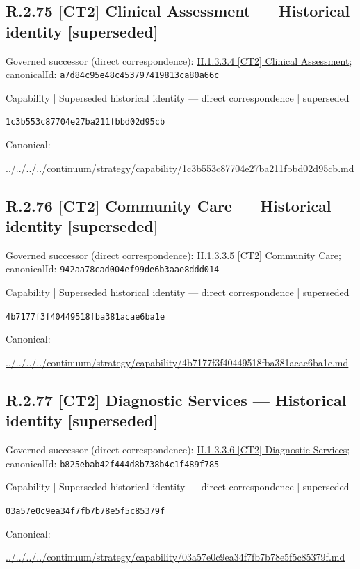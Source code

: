 \documentclass[10pt,a4paper]{article}
\begin{document}
\subsection*{R.2.75 [CT2] Clinical Assessment — Historical identity [superseded]}
Governed successor (direct correspondence): \hyperref[element-a7d84c95e48c453797419813ca80a66c]{II.1.3.3.4 [CT2] Clinical Assessment}; canonicalId: \texttt{a7d84c95e48c453797419813ca80a66c}\par
\label{element-1c3b553c87704e27ba211fbbd02d95cb}
{\small Capability | Superseded historical identity — direct correspondence | superseded}\par
\texttt{1c3b553c87704e27ba211fbbd02d95cb}\par
Canonical: \par
{\footnotesize\url{../../../../continuum/strategy/capability/1c3b553c87704e27ba211fbbd02d95cb.md}}\par
\subsection*{R.2.76 [CT2] Community Care — Historical identity [superseded]}
Governed successor (direct correspondence): \hyperref[element-942aa78cad004ef99de6b3aae8ddd014]{II.1.3.3.5 [CT2] Community Care}; canonicalId: \texttt{942aa78cad004ef99de6b3aae8ddd014}\par
\label{element-4b7177f3f40449518fba381acae6ba1e}
{\small Capability | Superseded historical identity — direct correspondence | superseded}\par
\texttt{4b7177f3f40449518fba381acae6ba1e}\par
Canonical: \par
{\footnotesize\url{../../../../continuum/strategy/capability/4b7177f3f40449518fba381acae6ba1e.md}}\par
\subsection*{R.2.77 [CT2] Diagnostic Services — Historical identity [superseded]}
Governed successor (direct correspondence): \hyperref[element-b825ebab42f444d8b738b4c1f489f785]{II.1.3.3.6 [CT2] Diagnostic Services}; canonicalId: \texttt{b825ebab42f444d8b738b4c1f489f785}\par
\label{element-03a57e0c9ea34f7fb7b78e5f5c85379f}
{\small Capability | Superseded historical identity — direct correspondence | superseded}\par
\texttt{03a57e0c9ea34f7fb7b78e5f5c85379f}\par
Canonical: \par
{\footnotesize\url{../../../../continuum/strategy/capability/03a57e0c9ea34f7fb7b78e5f5c85379f.md}}\par
\end{document}
